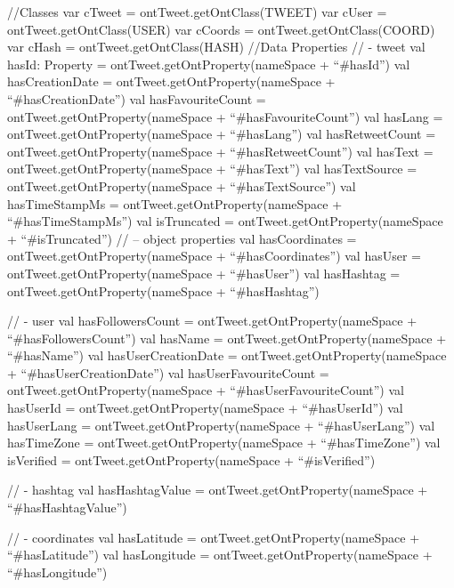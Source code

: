 \begin{listing}[
  language = scala,
  numbers=left,
  numberstyle=\tiny,
  stepnumber=5,
  numbersep=5pt,
  frame=single,
  caption  = {ms.semtweet: transformando tweet en triplas},
  label    = code:ms.semtweet]
{{    //Classes
    var cTweet = ontTweet.getOntClass(TWEET)
    var cUser = ontTweet.getOntClass(USER)
    var cCoords = ontTweet.getOntClass(COORD)
    var cHash = ontTweet.getOntClass(HASH)
    //Data Properties
    // - tweet
    val hasId: Property = ontTweet.getOntProperty(nameSpace + ``#hasId'')
    val hasCreationDate = ontTweet.getOntProperty(nameSpace + ``#hasCreationDate'')
    val hasFavouriteCount = ontTweet.getOntProperty(nameSpace + ``#hasFavouriteCount'')
    val hasLang = ontTweet.getOntProperty(nameSpace + ``#hasLang'')
    val hasRetweetCount = ontTweet.getOntProperty(nameSpace + ``#hasRetweetCount'')
    val hasText = ontTweet.getOntProperty(nameSpace + ``#hasText'')
    val hasTextSource = ontTweet.getOntProperty(nameSpace + ``#hasTextSource'')
    val hasTimeStampMs = ontTweet.getOntProperty(nameSpace + ``#hasTimeStampMs'')
    val isTruncated = ontTweet.getOntProperty(nameSpace + ``#isTruncated'')
    // -- object properties
    val hasCoordinates = ontTweet.getOntProperty(nameSpace + ``#hasCoordinates'')
    val hasUser = ontTweet.getOntProperty(nameSpace + ``#hasUser'')
    val hasHashtag = ontTweet.getOntProperty(nameSpace + ``#hasHashtag'')

    // - user
    val hasFollowersCount = ontTweet.getOntProperty(nameSpace + ``#hasFollowersCount'')
    val hasName = ontTweet.getOntProperty(nameSpace + ``#hasName'')
    val hasUserCreationDate = ontTweet.getOntProperty(nameSpace + ``#hasUserCreationDate'')
    val hasUserFavouriteCount = ontTweet.getOntProperty(nameSpace + ``#hasUserFavouriteCount'')
    val hasUserId = ontTweet.getOntProperty(nameSpace + ``#hasUserId'')
    val hasUserLang = ontTweet.getOntProperty(nameSpace + ``#hasUserLang'')
    val hasTimeZone = ontTweet.getOntProperty(nameSpace + ``#hasTimeZone'')
    val isVerified = ontTweet.getOntProperty(nameSpace + ``#isVerified'')

    // - hashtag
    val hasHashtagValue = ontTweet.getOntProperty(nameSpace + ``#hasHashtagValue'')

    // - coordinates
    val hasLatitude = ontTweet.getOntProperty(nameSpace + ``#hasLatitude'')
    val hasLongitude = ontTweet.getOntProperty(nameSpace + ``#hasLongitude'')

}}
\end{listing}

